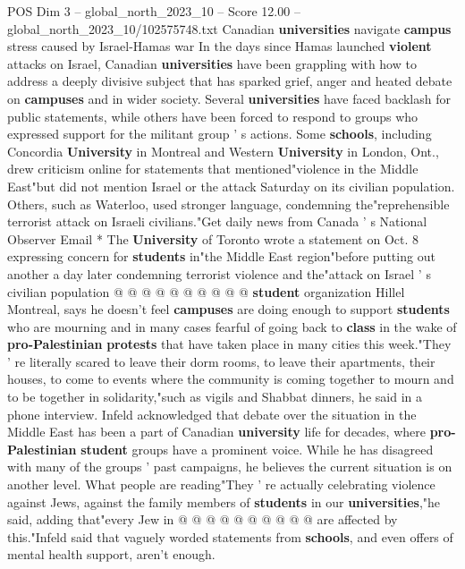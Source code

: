 \begin{textsample}{POS Dim 3 – global\_north\_2023\_10 – Score 12.00 – global\_north\_2023\_10/102575748.txt}  \label{ex:f3_pos_207}
Canadian \textbf{universities} navigate \textbf{campus} stress caused by Israel-Hamas war In the days since Hamas launched \textbf{violent} attacks on Israel, Canadian \textbf{universities} have been grappling with how to address a deeply divisive subject that has sparked grief, anger and heated debate on \textbf{campuses} and in wider society.
Several \textbf{universities} have faced backlash for public statements, while others have been forced to respond to groups who expressed support for the militant group ' s actions.
Some \textbf{schools}, including Concordia \textbf{University} in Montreal and Western \textbf{University} in London, Ont., drew criticism online for statements that mentioned"violence in the Middle East"but did not mention Israel or the attack Saturday on its civilian population.
Others, such as Waterloo, used stronger language, condemning the"reprehensible terrorist attack on Israeli civilians."Get daily news from Canada ' s National Observer Email * The \textbf{University} of Toronto wrote a statement on Oct. 8 expressing concern for \textbf{students} in"the Middle East region"before putting out another a day later condemning terrorist violence and the"attack on Israel ' s civilian population @ @ @ @ @ @ @ @ @ @ \textbf{student} organization Hillel Montreal, says he doesn't feel \textbf{campuses} are doing enough to support \textbf{students} who are mourning and in many cases fearful of going back to \textbf{class} in the wake of \textbf{pro-Palestinian} \textbf{protests} that have taken place in many cities this week."They ' re literally scared to leave their dorm rooms, to leave their apartments, their houses, to come to events where the community is coming together to mourn and to be together in solidarity,"such as vigils and Shabbat dinners, he said in a phone interview.
Infeld acknowledged that debate over the situation in the Middle East has been a part of Canadian \textbf{university} life for decades, where \textbf{pro-Palestinian} \textbf{student} groups have a prominent voice.
While he has disagreed with many of the groups ' past campaigns, he believes the current situation is on another level.
What people are reading"They ' re actually celebrating violence against Jews, against the family members of \textbf{students} in our \textbf{universities},"he said, adding that"every Jew in @ @ @ @ @ @ @ @ @ @ are affected by this."Infeld said that vaguely worded statements from \textbf{schools}, and even offers of mental health support, aren't enough.

\end{textsample}
